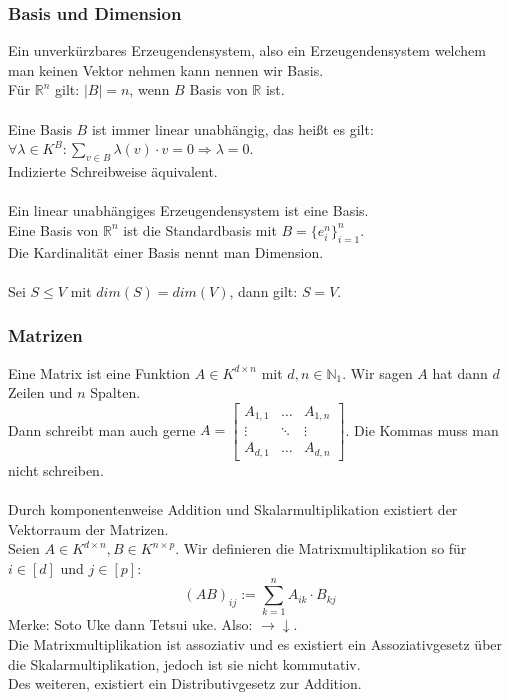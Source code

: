 \documentclass{article}
\begin{document}
\subsubsection*{Basis und Dimension}
Ein unverkürzbares Erzeugendensystem, also ein Erzeugendensystem welchem man keinen Vektor nehmen kann nennen wir Basis. \\
Für \(\mathbb R ^n\) gilt: \(|B| = n\), wenn \(B\) Basis von \(\mathbb R\) ist. \\ \\
Eine Basis \(B\) ist immer linear unabhängig, das heißt es gilt:\\
\(\forall \lambda \in K ^ B: \sum_{v \in B}^{} \lambda(v)\cdot v = 0 \Longrightarrow \lambda = 0\). \\
Indizierte Schreibweise äquivalent. \\ \\
Ein linear unabhängiges Erzeugendensystem ist eine Basis. \\
Eine Basis von \(\mathbb R ^n\) ist die Standardbasis mit \(B = \{e^n_i\}_{i=1}^n\).\\
Die Kardinalität einer Basis nennt man Dimension. \\ \\
Sei \(S \le V\) mit \(dim(S) = dim(V)\), dann gilt: \(S = V\).
\subsubsection*{Matrizen}
Eine Matrix ist eine Funktion \(A \in K^{d \times n}\) mit \(d,n \in \mathbb N_1\). Wir sagen \(A\) hat dann \(d\) Zeilen und \(n\) Spalten. \\
Dann schreibt man auch gerne \(A = \begin{bmatrix}
    A_{1,1} & \hdots & A_{1,n} \\
    \vdots & \ddots & \vdots \\
    A_{d,1} & \hdots & A_{d,n}
\end{bmatrix}\). Die Kommas muss man nicht schreiben.\\ \\
Durch komponentenweise Addition und Skalarmultiplikation existiert der Vektorraum der Matrizen. \\
Seien \(A \in K^{d \times n}, B \in K^{n \times p}\). Wir definieren die Matrixmultiplikation so für \(i \in [d]\) und \(j \in [p]\): \\
\[(AB)_{ij} := \sum_{k = 1}^{n} A_{ik} \cdot B_{kj}\]
Merke: Soto Uke dann Tetsui uke. Also: \(\rightarrow \downarrow\). \\
Die Matrixmultiplikation ist assoziativ und es existiert ein Assoziativgesetz über die Skalarmultiplikation, jedoch ist sie nicht kommutativ. \\
Des weiteren, existiert ein Distributivgesetz zur Addition.
\end{document}
